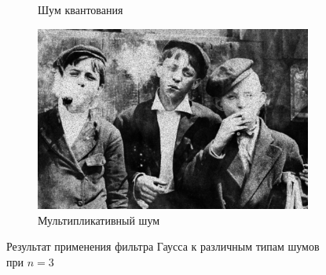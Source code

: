 \begin{figure}[ht]
\begin{subfigure}[b]{0.5\linewidth}
      \caption{Шум квантования} 
      \label{gaussian_3:e}
    \end{subfigure}%
    \begin{subfigure}[b]{0.5\linewidth}
        \centering
        \includegraphics[width=0.95\linewidth]{../Gaussian_Blur/Gaussian_Blur_Speckle_noise_(3,3).jpg} 
        \caption{Мультипликативный шум} 
        \label{gaussian_3:f} 
    \end{subfigure} 
    \caption{Результат применения фильтра Гаусса к различным типам шумов при $n = 3$}
    \label{img:gaussian_3} 
  \end{figure}

